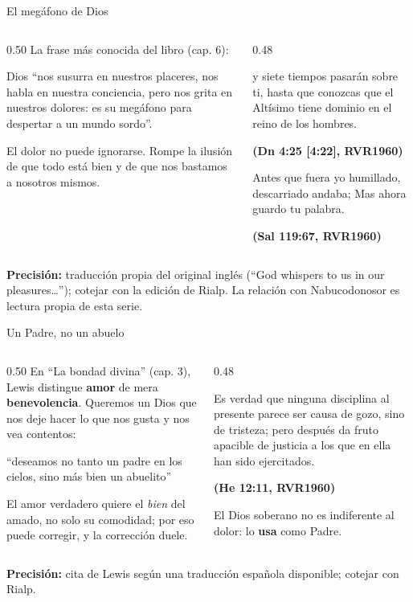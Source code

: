 \documentclass[hyperref={bookmarks=false},aspectratio=169]{beamer}
\newcommand{\fuente}[1]{\par\hfill{\upshape\bfseries\footnotesize\textcolor{azul}{#1}}}
\newcommand{\destacar}[1]{\textbf{\textcolor{azul}{#1}}}
\newcommand{\precision}[1]{{\footnotesize\color{gris}\textbf{Precisión:} #1}}
\begin{document}
\begin{frame}{El megáfono de Dios}
\begin{columns}[t,onlytextwidth]
\begin{column}{0.50\textwidth}\small
La frase más conocida del libro (cap. 6):
\begin{tcolorbox}[colback=papiro,colframe=dorado,boxrule=1.2pt,arc=3pt]
\footnotesize Dios ``nos susurra en nuestros placeres, nos habla en nuestra conciencia, pero nos grita en nuestros dolores: es su megáfono para despertar a un mundo sordo''.
\end{tcolorbox}
\scriptsize El dolor no puede ignorarse. Rompe la ilusión de que todo está bien y de que nos bastamos a nosotros mismos.
\end{column}
\begin{column}{0.48\textwidth}
\begin{cita}y siete tiempos pasarán sobre ti, hasta que conozcas que el Altísimo tiene dominio en el reino de los hombres.\fuente{(Dn 4:25 [4:22], RVR1960)}\end{cita}
\begin{cita}Antes que fuera yo humillado, descarriado andaba; Mas ahora guardo tu palabra.\fuente{(Sal 119:67, RVR1960)}\end{cita}
\end{column}
\end{columns}\par\smallskip
\precision{traducción propia del original inglés (``God whispers to us in our pleasures\ldots''); cotejar con la edición de Rialp. La relación con Nabucodonosor es lectura propia de esta serie.}
\end{frame}

\begin{frame}{Un Padre, no un abuelo}
\begin{columns}[t,onlytextwidth]
\begin{column}{0.50\textwidth}\small
En ``La bondad divina'' (cap. 3), Lewis distingue \destacar{amor} de mera \destacar{benevolencia}. Queremos un Dios que nos deje hacer lo que nos gusta y nos vea contentos:
\begin{tcolorbox}[colback=papiro,colframe=dorado,boxrule=1.2pt,arc=3pt]
\footnotesize ``deseamos no tanto un padre en los cielos, sino más bien un abuelito''
\end{tcolorbox}
\scriptsize El amor verdadero quiere el \emph{bien} del amado, no solo su comodidad; por eso puede corregir, y la corrección duele.
\end{column}
\begin{column}{0.48\textwidth}
\begin{cita}Es verdad que ninguna disciplina al presente parece ser causa de gozo, sino de tristeza; pero después da fruto apacible de justicia a los que en ella han sido ejercitados.\fuente{(He 12:11, RVR1960)}\end{cita}
\small El Dios soberano no es indiferente al dolor: lo \destacar{usa} como Padre.
\end{column}
\end{columns}\par\smallskip
\precision{cita de Lewis según una traducción española disponible; cotejar con Rialp.}
\end{frame}
\end{document}

